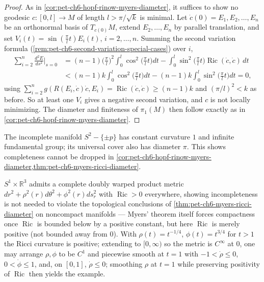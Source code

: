 \begin{proof}
  As in \cref{cor:pet-ch6-hopf-rinow-myers-diameter}, it suffices to show no
  geodesic $c:[0,l]\to M$ of length $l>\pi/\sqrt k$ is minimal. Let
  $\dot c(0)=E_1,E_2,\dots,E_n$ be an orthonormal basis of $T_{c(0)}M$, extend
  $E_2,\dots,E_n$ by parallel translation, and set
  $V_i(t)=\sin(\tfrac\pi lt)E_i(t)$, $i=2,\dots,n$. Summing the second
  variation formula (\cref{rem:pet-ch6-second-variation-special-cases}) over
  $i$,
  \begin{align*}
    \sum_{i=2}^n\frac{d^2E}{ds^2}\bigg|_{s=0}
    &=(n-1)\Big(\frac\pi l\Big)^2\int_0^l\cos^2\Big(\frac\pi lt\Big)dt
    -\int_0^l\sin^2\Big(\frac\pi lt\Big)\operatorname{Ric}(\dot c,\dot c)\,dt\\
    &<(n-1)k\int_0^l\cos^2\Big(\frac\pi lt\Big)dt-(n-1)k\int_0^l\sin^2\Big(\frac\pi lt\Big)dt=0,
  \end{align*}
  using $\sum_{i=2}^ng(R(E_i,\dot c)\dot c,E_i)=\operatorname{Ric}(\dot c,\dot c)\ge(n-1)k$
  and $(\pi/l)^2<k$ as before. So at least one $V_i$ gives a negative second
  variation, and $c$ is not locally minimizing. The diameter and finiteness
  of $\pi_1(M)$ then follow exactly as in
  \cref{cor:pet-ch6-hopf-rinow-myers-diameter}.
\end{proof}

\begin{example}
  \label{ex:pet-ch6-punctured-sphere-infinite-pi1}
  The incomplete manifold $S^2-\{\pm p\}$ has constant curvature $1$ and
  infinite fundamental group; its universal cover also has diameter $\pi$.
  This shows completeness cannot be dropped in
  \cref{cor:pet-ch6-hopf-rinow-myers-diameter,thm:pet-ch6-myers-ricci-diameter}.
\end{example}

\begin{example}
  \label{ex:pet-ch6-doubly-warped-ricci-positive}
  $S^1\times\mathbb{R}^3$ admits a complete doubly warped product metric
  $dr^2+\rho^2(r)d\theta^2+\phi^2(r)ds_r^2$ with $\operatorname{Ric}>0$ everywhere,
  showing incompleteness is not needed to violate the topological conclusions
  of \cref{thm:pet-ch6-myers-ricci-diameter} on noncompact manifolds — Myers'
  theorem itself forces compactness once $\operatorname{Ric}$ is bounded below by a
  positive constant, but here $\operatorname{Ric}$ is merely positive (not bounded
  away from $0$). With $\rho(t)=t^{-1/4}$, $\phi(t)=t^{3/4}$ for $t>1$ the
  Ricci curvature is positive; extending to $[0,\infty)$ so the metric is
  $C^\infty$ at $0$, one may arrange $\rho,\phi$ to be $C^1$ and piecewise
  smooth at $t=1$ with $-1<\dot\rho\le0$, $0<\dot\phi\le1$, and, on $[0,1]$,
  $\dot\rho\le0$; smoothing $\rho$ at $t=1$ while preserving positivity of
  $\operatorname{Ric}$ then yields the example.
\end{example}

